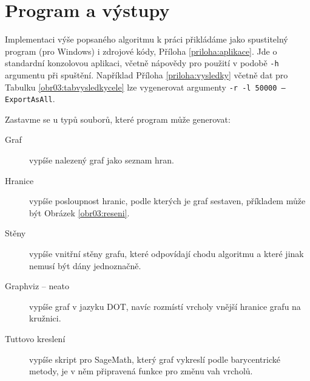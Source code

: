 \section{Program a výstupy} \label{prg&vystupy}

Implementaci výše popsaného algoritmu k práci přikládáme jako spustitelný program (pro Windows) i zdrojové kódy, Příloha \ref{priloha:aplikace}. Jde o standardní konzolovou aplikaci, včetně nápovědy pro použití v podobě \texttt{-h} argumentu při spuštění. Například Příloha \ref{priloha:vysledky} včetně dat pro Tabulku \ref{obr03:tabvysledkycele} lze vygenerovat argumenty \texttt{-r -l 50000 --ExportAsAll}.

Zastavme se u typů souborů, které program může generovat:
\begin{description}

\item[Graf] vypíše nalezený graf jako seznam hran.
\item[Hranice] vypíše posloupnost hranic, podle kterých je graf sestaven, příkladem může být Obrázek \ref{obr03:reseni}.
\item[Stěny] vypíše vnitřní stěny grafu, které odpovídají chodu algoritmu a které jinak nemusí být dány jednoznačně.
\item[Graphviz -- neato] vypíše graf v jazyku DOT, navíc rozmístí vrcholy vnější hranice grafu na kružnici.
\item[Tuttovo kreslení] vypíše skript pro SageMath, který graf vykreslí podle barycentrické metody, je v něm připravená funkce pro změnu vah vrcholů.

\end{description}


